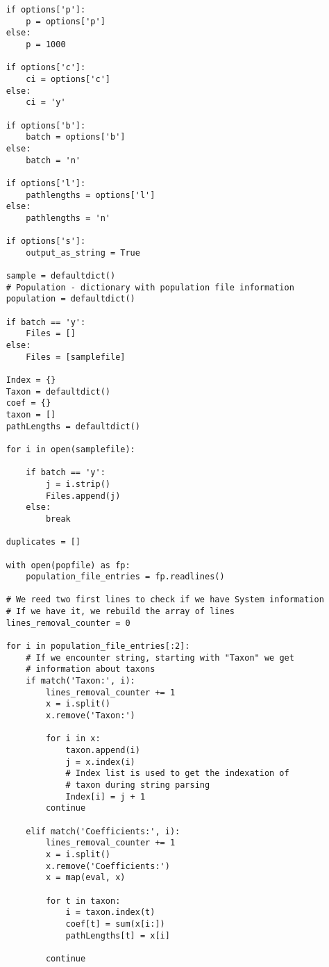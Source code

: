 \documentclass[a4paper,11pt]{article}
\begin{document}
\begin{lstlisting}
    if options['p']:
        p = options['p']
    else:
        p = 1000

    if options['c']:
        ci = options['c']
    else:
        ci = 'y'

    if options['b']:
        batch = options['b']
    else:
        batch = 'n'

    if options['l']:
        pathlengths = options['l']
    else:
        pathlengths = 'n'

    if options['s']:
        output_as_string = True

    sample = defaultdict()
    # Population - dictionary with population file information
    population = defaultdict()

    if batch == 'y':
        Files = []
    else:
        Files = [samplefile]

    Index = {}
    Taxon = defaultdict()
    coef = {}
    taxon = []
    pathLengths = defaultdict()

    for i in open(samplefile):

        if batch == 'y':
            j = i.strip()
            Files.append(j)
        else:
            break

    duplicates = []

    with open(popfile) as fp:
        population_file_entries = fp.readlines()

    # We reed two first lines to check if we have System information
    # If we have it, we rebuild the array of lines
    lines_removal_counter = 0

    for i in population_file_entries[:2]:
        # If we encounter string, starting with "Taxon" we get
        # information about taxons
        if match('Taxon:', i):
            lines_removal_counter += 1
            x = i.split()
            x.remove('Taxon:')

            for i in x:
                taxon.append(i)
                j = x.index(i)
                # Index list is used to get the indexation of
                # taxon during string parsing
                Index[i] = j + 1
            continue

        elif match('Coefficients:', i):
            lines_removal_counter += 1
            x = i.split()
            x.remove('Coefficients:')
            x = map(eval, x)

            for t in taxon:
                i = taxon.index(t)
                coef[t] = sum(x[i:])
                pathLengths[t] = x[i]

            continue


\end{lstlisting}
\end{document}
